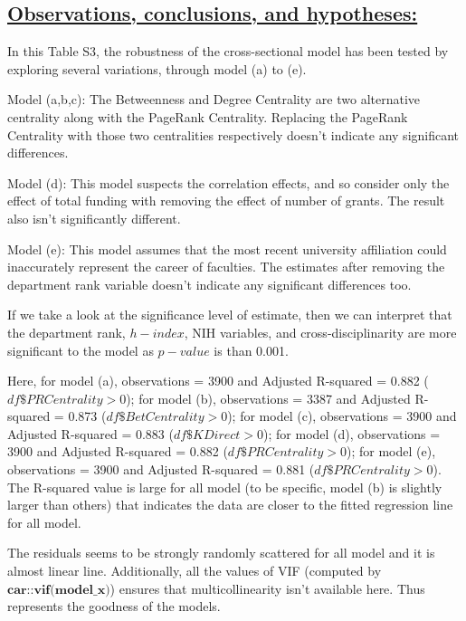 \documentclass{article}\usepackage[]{graphicx}\usepackage[]{color}
\begin{document}
\subsection*{\underline{Observations, conclusions, and hypotheses:}}
\begin{description}
  \item In this Table S3, the robustness of the cross-sectional model has been tested by exploring several variations, through model (a) to (e). 
  \item[$\bullet$]  Model (a,b,c): The Betweenness and Degree Centrality are two alternative centrality along with the PageRank Centrality. Replacing the PageRank Centrality with those two centralities respectively doesn't indicate any significant differences.
  \item[$\bullet$]  Model (d): This model suspects the correlation effects, and so consider only the effect of total funding with removing the effect of number of grants. The result also isn't significantly different.
    \item[$\bullet$]  Model (e): This model assumes that the most recent university affiliation could inaccurately represent the career of faculties. The estimates after removing the department rank variable doesn't indicate any significant differences too.
    \item[$\bullet$] If we take a look at the significance level of estimate, then we can interpret that the department rank, $h-index$, NIH variables, and cross-disciplinarity are more significant to the model as $p-value$ is than 0.001. 
    \item[$\bullet$] Here, for model (a), observations = 3900 and Adjusted R-squared = 0.882 ($df\$PRCentrality > 0$); for model (b), observations = 3387 and Adjusted R-squared = 0.873 ($df\$BetCentrality > 0$); for model (c), observations = 3900 and Adjusted R-squared = 0.883 ($df\$KDirect > 0$); for model (d), observations = 3900 and Adjusted R-squared = 0.882 ($df\$PRCentrality > 0$); for model (e), observations = 3900 and Adjusted R-squared = 0.881 ($df\$PRCentrality > 0$). The R-squared value is large for all model (to be specific, model (b) is slightly larger than others) that indicates the data are closer to the fitted regression line for all model. 
    \item[$\bullet$] The residuals seems to be strongly randomly scattered for all model and it is almost linear line. Additionally, all the values of VIF (computed by $\textbf{car::vif(model\_x)}$) ensures that multicollinearity isn’t available here. Thus represents the goodness of the models. 

\end{description}
\end{document}
